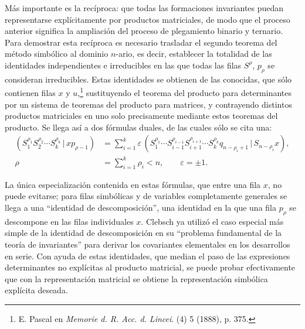 \documentclass[11pt]{article}
\newcommand{\pair}[2]{(#1\,|\,#2)}
\newcommand{\eps}{\varepsilon}
\begin{document}
Más importante es la recíproca: que todas las formaciones invariantes puedan representarse explícitamente por productos matriciales, de modo que el proceso anterior significa la ampliación del proceso de plegamiento binario y ternario. Para demostrar esta recíproca es necesario trasladar el segundo teorema del método simbólico al dominio $n$-ario, es decir, establecer la totalidad de las identidades independientes e irreducibles en las que todas las filas $S^\rho$, $p_\rho$ se consideran irreducibles. Estas identidades se obtienen de las conocidas, que sólo contienen filas $x$ y $u$,\footnote{E. Pascal en \emph{Memorie d. R. Acc. d. Lincei}. (4) 5 (1888), p. 375.} sustituyendo el teorema del producto para determinantes por un sistema de teoremas del producto para matrices, y contrayendo distintos productos matriciales en uno solo precisamente mediante estos teoremas del producto. Se llega así a dos fórmulas duales, de las cuales sólo se cita una:
\begin{equation}
\begin{aligned}
 \pair{S_1^{\rho_1}S_2^{\rho_2}\cdots S_k^{\rho_k}}{x p_{\rho-1}}
 &=\sum_{i=1}^{k}\eps\,\pair{S_1^{\rho_1}\cdots S_{i-1}^{\rho_{i-1}}S_{i+1}^{\rho_{i+1}}\cdots S_k^{\rho_k}q_{n-\rho_i+1}}{S_{n-\rho_i}x},\\
 \rho&=\sum_{i=1}^{k}\rho_i<n,\qquad \eps=\pm1.
\end{aligned}
\tag{2}
\end{equation}

La única especialización contenida en estas fórmulas, que entre una fila $x$, no puede evitarse; para filas simbólicas y de variables completamente generales se llega a una ``identidad de descomposición'', una identidad en la que una fila $p_\rho$ se descompone en las filas individuales $x$. Clebsch ya utilizó el caso especial más simple de la identidad de descomposición en su ``problema fundamental de la teoría de invariantes'' para derivar los covariantes elementales en los desarrollos en serie. Con ayuda de estas identidades, que median el paso de las expresiones determinantes no explícitas al producto matricial, se puede probar efectivamente que con la representación matricial se obtiene la representación simbólica explícita deseada.
\end{document}
